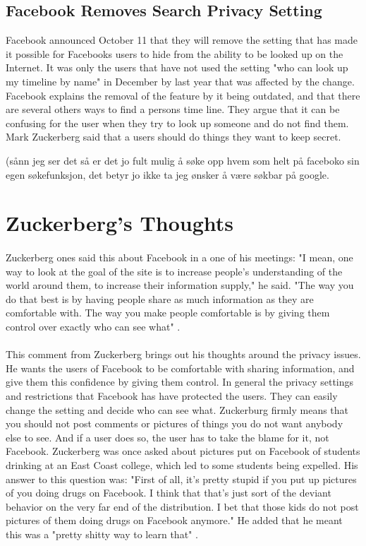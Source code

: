 \subsection{Facebook Removes Search Privacy Setting}
Facebook announced October 11 that they will remove the setting that has made it possible for Facebooks users to hide from the ability to be looked up on the Internet\cite{searchSetting}. It was only the users that have not used the setting "who can look up my timeline by name" in December by last year that was affected by the change. Facebook explains the removal of the feature by it being outdated, and that there are several others ways to find a persons time line. They argue that it can be confusing for the user when they try to look up someone and do not find them. Mark Zuckerberg said that a users should do things they want to keep secret.

(sånn jeg ser det så er det jo fult mulig å søke opp hvem som helt på faceboko sin egen søkefunksjon, det betyr jo ikke ta jeg ønsker å være søkbar på google. 


\section{Zuckerberg's Thoughts}

\paragraph{}
Zuckerberg ones said this about Facebook in a one of his meetings: "I mean, one way to look at the goal of the site is to increase people’s understanding of the world around them, to increase their information supply," he said. "The way you do that best is by having people share as much information as they are comfortable with. The way you make people comfortable is by giving them control over exactly who can see what" \cite{MeMedia}.

\paragraph{}
This comment from Zuckerberg brings out his thoughts around the privacy issues. He wants the users of Facebook to be comfortable with sharing information, and give them this confidence by giving them control. In general the privacy settings and restrictions that Facebook has have protected the users. They can easily change the setting and decide who can see what. Zuckerburg firmly means that you should not post comments or pictures of things you do not want anybody else to see. And if a user does so, the user has to take the blame for it, not Facebook. Zuckerberg was once asked about pictures put on Facebook of students drinking at an East Coast college, which led to some students being expelled. His answer to this question was: "First of all, it's pretty stupid if you put up pictures of you doing drugs on Facebook. I think that that's just sort of the deviant behavior on the very far end of the distribution. I bet that those kids do not post pictures of them doing drugs on Facebook anymore." He added that he meant this was a "pretty shitty way to learn that" \cite{MeMedia}.

